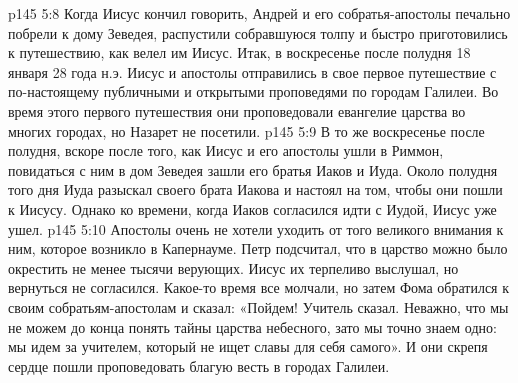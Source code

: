 \vs p145 5:8 Когда Иисус кончил говорить, Андрей и его собратья\hyp{}апостолы печально побрели к дому Зеведея, распустили собравшуюся толпу и быстро приготовились к путешествию, как велел им Иисус. Итак, в воскресенье после полудня 18 января 28 года н.э. Иисус и апостолы отправились в свое первое путешествие с по\hyp{}настоящему публичными и открытыми проповедями по городам Галилеи. Во время этого первого путешествия они проповедовали евангелие царства во многих городах, но Назарет не посетили.
\vs p145 5:9 В то же воскресенье после полудня, вскоре после того, как Иисус и его апостолы ушли в Риммон, повидаться с ним в дом Зеведея зашли его братья Иаков и Иуда. Около полудня того дня Иуда разыскал своего брата Иакова и настоял на том, чтобы они пошли к Иисусу. Однако ко времени, когда Иаков согласился идти с Иудой, Иисус уже ушел.
\vs p145 5:10 Апостолы очень не хотели уходить от того великого внимания к ним, которое возникло в Капернауме. Петр подсчитал, что в царство можно было окрестить не менее тысячи верующих. Иисус их терпеливо выслушал, но вернуться не согласился. Какое\hyp{}то время все молчали, но затем Фома обратился к своим собратьям\hyp{}апостолам и сказал: «Пойдем! Учитель сказал. Неважно, что мы не можем до конца понять тайны царства небесного, зато мы точно знаем одно: мы идем за учителем, который не ищет славы для себя самого». И они скрепя сердце пошли проповедовать благую весть в городах Галилеи.

